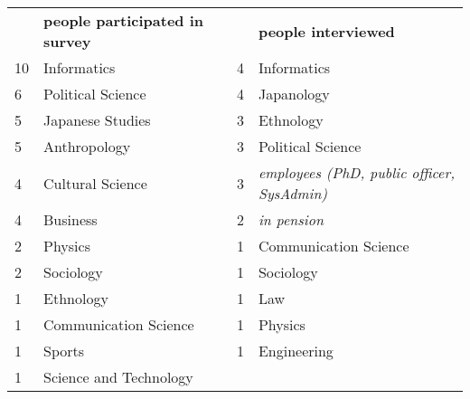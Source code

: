 \begin{tabular}{lllll}
   & \textbf{people participated in survey} &  &   & \textbf{people interviewed}                        \\
10 & Informatics                            &  & 4 & Informatics                                        \\
6  & Political Science                      &  & 4 & Japanology                                         \\
5  & Japanese Studies                       &  & 3 & Ethnology                                          \\
5  & Anthropology                           &  & 3 & Political Science                                  \\
4  & Cultural Science                       &  & 3 & \textit{employees (PhD, public officer, SysAdmin)} \\
4  & Business                               &  & 2 & \textit{in pension}                                \\
2  & Physics                                &  & 1 & Communication Science                              \\
2  & Sociology                              &  & 1 & Sociology                                          \\
1  & Ethnology                              &  & 1 & Law                                                \\
1  & Communication Science                  &  & 1 & Physics                                            \\
1  & Sports                                 &  & 1 & Engineering                                        \\
1  & Science and Technology                 &  &   &                                                   
\end{tabular}
